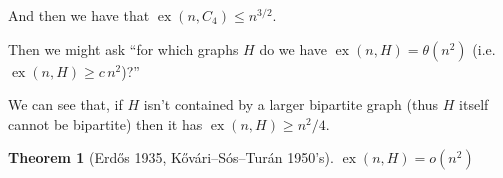 \documentclass[english, dark, index]{Iart}
\newtheorem{theorem}{Theorem}[part]
\DeclareMathOperator{\ex}{ex}
\begin{document}
	And then we have that $ \ex(n,C_4)\leqslant n^{3/2} $.
	
	
	Then we might ask ``for which graphs $ H $ do we have $ \ex(n,H)=\theta(n^{2}) $ (i.e. $ \ex(n,H)\geqslant c\,n^{2} $)?''
	
	We can see that, if $ H $ isn't contained by a larger bipartite graph (thus $ H $ itself cannot be bipartite) then it has $ \ex(n,H)\geqslant n^{2}/4 $.
	
	\begin{theorem}[Erdős 1935, Kővári--Sós--Turán 1950's]
		$ \ex(n,H)=o(n^{2}) $
	\end{theorem}

	
\end{document}
